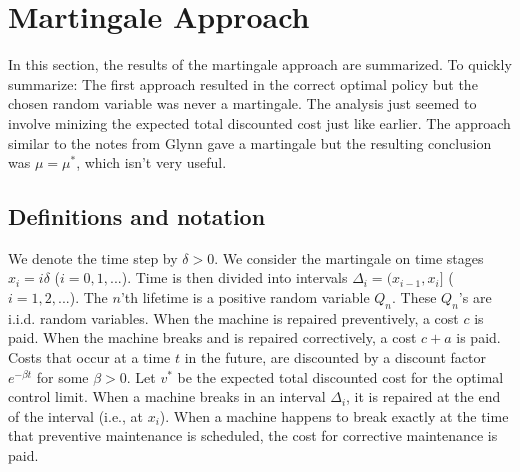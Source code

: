 


\chapter{Martingale Approach}
In this section, the results of the martingale approach are summarized.
To quickly summarize: The first approach resulted in the correct optimal policy but the chosen random variable was never a martingale.
The analysis just seemed to involve minizing the expected total discounted cost just like earlier.
The approach similar to the notes from Glynn gave a martingale but the resulting conclusion was $\mu=\mu^*$, which isn't very useful.

\section{Definitions and notation}
We denote the time step by $\delta>0$.
We consider the martingale on time stages $x_i=i\delta$ ($i=0,1,...$).
Time is then divided into intervals $\Delta_i=(x_{i-1},x_i]$ ($i=1,2,...$).
The $n$'th lifetime is a positive random variable $Q_n$.
These $Q_n$'s are i.i.d. random variables.
When the machine is repaired preventively, a cost $c$ is paid.
When the machine breaks and is repaired correctively, a cost $c+a$ is paid.
Costs that occur at a time $t$ in the future, are discounted by a discount factor $e^{-\beta t}$ for some $\beta>0$.
Let $v^*$ be the expected total discounted cost for the optimal control limit.
When a machine breaks in an interval $\Delta_i$, it is repaired at the end of the interval (i.e., at $x_i$).
When a machine happens to break exactly at the time that preventive maintenance is scheduled, the cost for corrective maintenance is paid.

